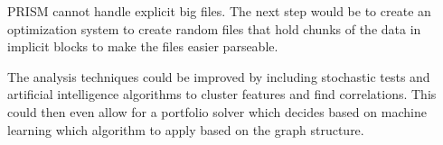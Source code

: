 PRISM cannot handle explicit big files.
The next step would be to create an optimization system to create random files that hold chunks of the data in implicit blocks to make the files easier parseable.

The analysis techniques could be improved by including stochastic tests and artificial intelligence algorithms to cluster features and find correlations.
This could then even allow for a portfolio solver which decides based on machine learning which algorithm to apply based on the graph structure.